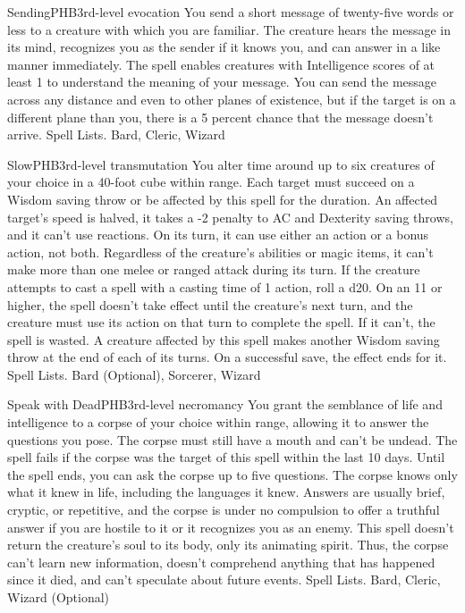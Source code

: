 \begin{spell}{Sending}{PHB}{3rd-level evocation}
{
}
You send a short message of twenty-five words or less to a creature with which you are familiar. The creature hears the message in its mind, recognizes you as the sender if it knows you, and can answer in a like manner immediately. The spell enables creatures with Intelligence scores of at least 1 to understand the meaning of your message.
You can send the message across any distance and even to other planes of existence, but if the target is on a different plane than you, there is a 5 percent chance that the message doesn't arrive.
Spell Lists. Bard, Cleric, Wizard
\end{spell}

\begin{spell}{Slow}{PHB}{3rd-level transmutation}
{
}
You alter time around up to six creatures of your choice in a 40-foot cube within range. Each target must succeed on a Wisdom saving throw or be affected by this spell for the duration.
An affected target’s speed is halved, it takes a -2 penalty to AC and Dexterity saving throws, and it can’t use reactions. On its turn, it can use either an action or a bonus action, not both. Regardless of the creature’s abilities or magic items, it can’t make more than one melee or ranged attack during its turn.
If the creature attempts to cast a spell with a casting time of 1 action, roll a d20. On an 11 or higher, the spell doesn’t take effect until the creature’s next turn, and the creature must use its action on that turn to complete the spell. If it can’t, the spell is wasted.
A creature affected by this spell makes another Wisdom saving throw at the end of each of its turns. On a successful save, the effect ends for it.
Spell Lists. Bard (Optional), Sorcerer, Wizard
\end{spell}

\begin{spell}{Speak with Dead}{PHB}{3rd-level necromancy}
{
}
You grant the semblance of life and intelligence to a corpse of your choice within range, allowing it to answer the questions you pose. The corpse must still have a mouth and can’t be undead. The spell fails if the corpse was the target of this spell within the last 10 days.
Until the spell ends, you can ask the corpse up to five questions. The corpse knows only what it knew in life, including the languages it knew. Answers are usually brief, cryptic, or repetitive, and the corpse is under no compulsion to offer a truthful answer if you are hostile to it or it recognizes you as an enemy. This spell doesn’t return the creature’s soul to its body, only its animating spirit. Thus, the corpse can’t learn new information, doesn’t comprehend anything that has happened since it died, and can’t speculate about future events.
Spell Lists. Bard, Cleric, Wizard (Optional)
\end{spell}

